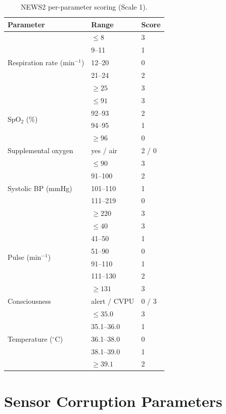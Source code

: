 \documentclass[lettersize,journal]{IEEEtran}
\begin{document}
\begin{table}[h]
\caption{NEWS2 per-parameter scoring (Scale 1).}
\label{tab:news2}
\centering
\footnotesize
\begin{tabular}{lll}
\toprule
Parameter & Range & Score \\
\midrule
\multirow{5}{*}{Respiration rate (min$^{-1}$)}
  & $\le 8$        & 3 \\
  & 9--11          & 1 \\
  & 12--20         & 0 \\
  & 21--24         & 2 \\
  & $\ge 25$       & 3 \\
\midrule
\multirow{4}{*}{SpO$_2$ (\%)}
  & $\le 91$       & 3 \\
  & 92--93         & 2 \\
  & 94--95         & 1 \\
  & $\ge 96$       & 0 \\
\midrule
Supplemental oxygen & yes / air & 2 / 0 \\
\midrule
\multirow{5}{*}{Systolic BP (mmHg)}
  & $\le 90$       & 3 \\
  & 91--100        & 2 \\
  & 101--110       & 1 \\
  & 111--219       & 0 \\
  & $\ge 220$      & 3 \\
\midrule
\multirow{6}{*}{Pulse (min$^{-1}$)}
  & $\le 40$       & 3 \\
  & 41--50         & 1 \\
  & 51--90         & 0 \\
  & 91--110        & 1 \\
  & 111--130       & 2 \\
  & $\ge 131$      & 3 \\
\midrule
Consciousness & alert / CVPU & 0 / 3 \\
\midrule
\multirow{5}{*}{Temperature ($^{\circ}$C)}
  & $\le 35.0$     & 3 \\
  & 35.1--36.0     & 1 \\
  & 36.1--38.0     & 0 \\
  & 38.1--39.0     & 1 \\
  & $\ge 39.1$     & 2 \\
\bottomrule
\end{tabular}
\end{table}

\section{Sensor Corruption Parameters}
\label{app:noise}
\end{document}
